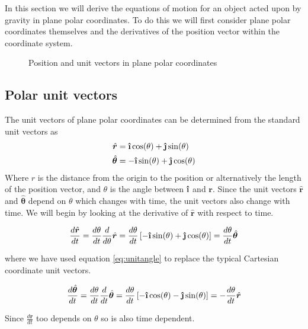 In this section we will derive the equations of motion for an object acted upon by gravity in plane
polar coordinates. To do this we will first consider plane polar coordinates themselves and the derivatives of the position vector within the coordinate system.
\begin{figure}[h]
  \centering
 
\caption{Position and unit vectors in plane polar coordinates} \label{fig:PolarCoordinates}
\end{figure}

\subsection{Polar unit vectors}
The unit vectors of plane polar coordinates can be determined from the standard unit vectors as
\begin{align}
\hat{\bm{r}} &= \uveci \cos( \theta ) + \uvecj \sin( \theta ) \label{eq:unitrad} \\
\hat{\bm{\theta}}  &= - \uveci \sin( \theta ) + \uvecj \cos( \theta ) \label{eq:unitangle}
\end{align}
Where $r$ is the distance from the origin to the position or alternatively the length of the position vector, and $\theta$ is the angle between $\uveci$ and $\bm{r}$.
Since the unit vectors $\hat{\bm{r}}$ and $\hat{\bm{\theta}}$ depend on $\theta$ which changes with time, the unit vectors also change with time. We will begin by looking at the derivative of $\hat{\bm{r}}$ with respect to time.

\begin{equation} \label{eq:radvel}
\frac{d {\hat{\bm{r}}}}{d t} = \frac{ d \theta}{d t}\frac{d}{d \theta} \hat{\bm{r}} =  \frac{ d \theta}{d t} \left[ -\uveci \sin( \theta ) + \uvecj \cos( \theta ) \right] = \frac{ d \theta}{d t} \hat{\bm{\theta}}
\end{equation}

where we have used equation \ref{eq:unitangle} to replace the typical Cartesian coordinate unit vectors.

\begin{equation}\label{eq:angvel}
\frac{d {\hat{\bm{\theta}}}}{d t}=\frac{d \theta}{d t} \frac{d}{dt}{\hat{\bm{\theta}}}=\frac{d \theta}{d t}  \left[ - \uveci \cos( \theta ) - \uvecj \sin( \theta ) \right]=- \frac{d \theta}{d t} \hat{\bm{r}}
\end{equation}

 Since $\frac{d {\hat{\bm{r}}}}{d t}$ too depends on $\theta$ so is also time dependent.

